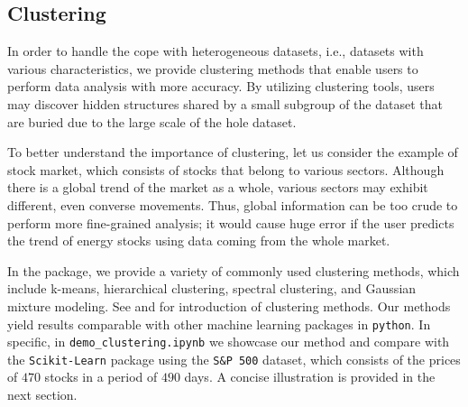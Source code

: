 
\subsection{Clustering}
In order to handle the cope with heterogeneous datasets, i.e., datasets with various  characteristics, we provide clustering methods that enable users to perform data analysis with more accuracy.  By utilizing clustering tools, users may discover hidden structures shared by a small subgroup of the dataset  that are buried due to the large scale of the hole dataset. 

To better understand the importance of clustering, let us consider the example of stock market, which consists of stocks that  belong to various sectors. Although there is a global trend of the market as a whole, various sectors may exhibit  different, even converse movements. Thus, global information can be too crude to perform more fine-grained analysis; it would cause huge error if the user predicts the trend of energy stocks using data coming from the whole market.

In the package, we provide a variety of commonly used clustering methods, which include k-means, hierarchical clustering,  spectral clustering, and Gaussian mixture modeling. See   \cite{elsbook} and \cite{bishop2006pattern} for introduction of clustering methods. Our methods yield results  comparable with other machine learning packages in \texttt{python}. In specific, in \texttt{demo\_clustering.ipynb} we showcase our method and  compare with the \texttt{Scikit-Learn} package using the \texttt{S\&P 500} dataset, which consists of the prices of $470$ stocks in a period of $490$ days. A concise illustration is provided in the next section.